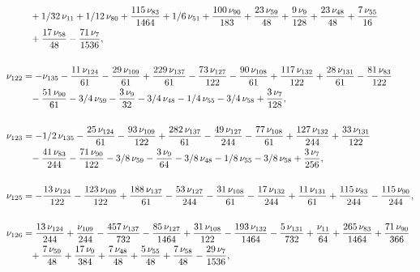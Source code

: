 \documentclass[a4paper,12pt, DIV=14, BCOR=5mm, twoside, headsepline]{scrbook}
\begin{document}
\begin{align}
\begin{aligned}
 &\hphantom{=}+1/32\,\nu_{{11}}
+1/12\,\nu_{{80}}+{\frac {115\,\nu_{{83}}}{1464}}+1/6\,\nu_{{51}}+{
\frac {100\,\nu_{{90}}}{183}}+{\frac {23\,\nu_{{59}}}{48}}+{\frac {9\,
\nu_{{9}}}{128}}+{\frac {23\,\nu_{{48}}}{48}}+{\frac {7\,\nu_{{55}}}{
16}}\\
 &\hphantom{=}+{\frac {17\,\nu_{{58}}}{48}}-{\frac {71\,\nu_{{7}}}{1536}}, \\
\\
\nu_{{
122}}&=-\nu_{{135}}-{\frac {11\,\nu_{{124}}}{61}}-{\frac {29\,\nu_{{109
}}}{61}}+{\frac {229\,\nu_{{137}}}{61}}-{\frac {73\,\nu_{{127}}}{122}}
-{\frac {90\,\nu_{{108}}}{61}}+{\frac {117\,\nu_{{132}}}{122}}+{\frac 
{28\,\nu_{{131}}}{61}}-{\frac {81\,\nu_{{83}}}{122}}\\
 &\hphantom{=}-{\frac {51\,\nu_{
{90}}}{61}}-3/4\,\nu_{{59}}-{\frac {3\,\nu_{{9}}}{32}}-3/4\,\nu_{{48}}
-1/4\,\nu_{{55}}-3/4\,\nu_{{58}}+{\frac {3\,\nu_{{7}}}{128}}, \\
\\
\nu_{{123
}}&=-1/2\,\nu_{{135}}-{\frac {25\,\nu_{{124}}}{61}}-{\frac {93\,\nu_{{
109}}}{122}}+{\frac {282\,\nu_{{137}}}{61}}-{\frac {49\,\nu_{{127}}}{
244}}-{\frac {77\,\nu_{{108}}}{61}}+{\frac {127\,\nu_{{132}}}{244}}+{
\frac {33\,\nu_{{131}}}{122}}\\
 &\hphantom{=}-{\frac {41\,\nu_{{83}}}{244}}-{\frac {71
\,\nu_{{90}}}{122}}-3/8\,\nu_{{59}}-{\frac {3\,\nu_{{9}}}{64}}-3/8\,
\nu_{{48}}-1/8\,\nu_{{55}}-3/8\,\nu_{{58}}+{\frac {3\,\nu_{{7}}}{256}},\\
\\
\nu_{{125}}&=-{\frac {13\,\nu_{{124}}}{122}}-{\frac {123\,\nu_{{109}}
}{122}}+{\frac {188\,\nu_{{137}}}{61}}-{\frac {53\,\nu_{{127}}}{244}}-
{\frac {31\,\nu_{{108}}}{61}}-{\frac {17\,\nu_{{132}}}{244}}+{\frac {
11\,\nu_{{131}}}{61}}+{\frac {115\,\nu_{{83}}}{244}}-{\frac {115\,\nu_
{{90}}}{244}}, \\
\\
\nu_{{126}}&={\frac {13\,\nu_{{124}}}{244}}+{\frac {\nu_{
{109}}}{244}}-{\frac {457\,\nu_{{137}}}{732}}-{\frac {85\,\nu_{{127}}
}{1464}}+{\frac {31\,\nu_{{108}}}{122}}-{\frac {193\,\nu_{{132}}}{1464
}}-{\frac {5\,\nu_{{131}}}{732}}+{\frac {\nu_{{11}}}{64}}+{\frac {265
\,\nu_{{83}}}{1464}}+{\frac {71\,\nu_{{90}}}{366}}\\
 &\hphantom{=}+{\frac {7\,\nu_{{59
}}}{48}}+{\frac {17\,\nu_{{9}}}{384}}+{\frac {7\,\nu_{{48}}}{48}}+{
\frac {5\,\nu_{{55}}}{48}}+{\frac {7\,\nu_{{58}}}{48}}-{\frac {29\,\nu
_{{7}}}{1536}},
\end{aligned}
\end{align}
\end{document}
